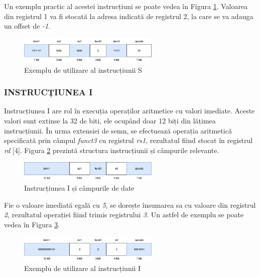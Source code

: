 \documentclass[12pt]{article}
\begin{document}
Un exemplu practic al acestei instrucțiuni se poate vedea în Figura \ref{Figura:13}. Valoarea din registrul 1 va fi stocată la adresa indicată de registrul 2, la care se va adauga un offset de \textit{-1}.

 \begin{figure}[h!]
 \includegraphics[width=0.6\textwidth]{stypeexample.png}
 \centering
 \caption{Exemplu de utilizare al instrucțiunii S}
 \label{Figura:13}
 \end{figure}
 
 \subsubsection{INSTRUCȚIUNEA I}
 Instrucțiunea I are rol în execuția operaților aritmetice cu valori imediate. Aceste valori sunt extinse la 32 de biti, ele ocupând doar 12 biți din lățimea instrucțiunii. În urma extensiei de semn, se efectuează operația aritmetică specificată prin câmpul \textit{funct3} cu registrul \textit{rs1}, rezultatul fiind stocat în registrul \textit{rd} [4]. Figura \ref{Figura:14} prezintă structura instrucțiunii și câmpurile relevante.

 \begin{figure}[h!]
 \includegraphics[width=0.6\textwidth]{itype.png}
 \centering
 \caption{Instrucțiunea I și câmpurile de date}
 \label{Figura:14}
 \end{figure}

 Fie o valoare imediată egală cu \textit{5}, se dorește însumarea sa cu valoare din registrul \textit{2}, rezultatul operației fiind trimis registrului \textit{3}. Un astfel de exemplu se poate vedea în Figura \ref{Figura:15}.

 \begin{figure}[h!]
 \includegraphics[width=0.6\textwidth]{itypeexample.png}
 \centering
 \caption{Exemplu de utilizare al instrucțiunii I}
 \label{Figura:15}
 \end{figure}
 
\end{document}
